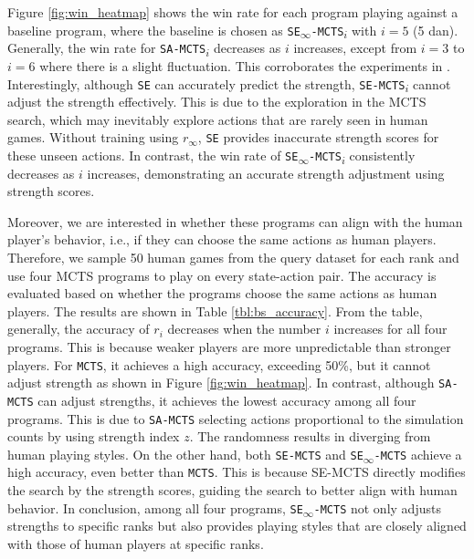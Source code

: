Figure \ref{fig:win_heatmap} shows the win rate for each program playing against a baseline program, where the baseline is chosen as \texttt{SE\textsubscript{$\infty$}-MCTS\textsubscript{$i$}} with $i=5$ (5 dan).
Generally, the win rate for \texttt{SA-MCTS\textsubscript{$i$}} decreases as $i$ increases, except from $i=3$ to $i=6$ where there is a slight fluctuation.
This corroborates the experiments in \citep{wu_strength_2019}.
Interestingly, although \texttt{SE} can accurately predict the strength, \texttt{SE-MCTS\textsubscript{$i$}} cannot adjust the strength effectively.
This is due to the exploration in the MCTS search, which may inevitably explore actions that are rarely seen in human games.
Without training using $r_\infty$, \texttt{SE} provides inaccurate strength scores for these unseen actions.
In contrast, the win rate of \texttt{SE\textsubscript{$\infty$}-MCTS\textsubscript{$i$}} consistently decreases as $i$ increases, demonstrating an accurate strength adjustment using strength scores.


% 

Moreover, we are interested in whether these programs can align with the human player's behavior, i.e., if they can choose the same actions as human players.
Therefore, we sample 50 human games from the query dataset for each rank and use four MCTS programs to play on every state-action pair.
The accuracy is evaluated based on whether the programs choose the same actions as human players.
The results are shown in Table \ref{tbl:bs_accuracy}.
From the table, generally, the accuracy of $r_i$ decreases when the number $i$ increases for all four programs.
This is because weaker players are more unpredictable than stronger players.
For \texttt{MCTS}, it achieves a high accuracy, exceeding 50\%, but it cannot adjust strength as shown in Figure \ref{fig:win_heatmap}.
In contrast, although \texttt{SA-MCTS} can adjust strengths, it achieves the lowest accuracy among all four programs.
This is due to \texttt{SA-MCTS} selecting actions proportional to the simulation counts by using strength index $z$.
The randomness results in diverging from human playing styles.
On the other hand, both \texttt{SE-MCTS} and \texttt{SE\textsubscript{$\infty$}-MCTS} achieve a high accuracy, even better than \texttt{MCTS}.
This is because SE-MCTS directly modifies the search by the strength scores, guiding the search to better align with human behavior. 
In conclusion, among all four programs, \texttt{SE\textsubscript{$\infty$}-MCTS} not only adjusts strengths to specific ranks but also provides playing styles that are closely aligned with those of human players at specific ranks.


